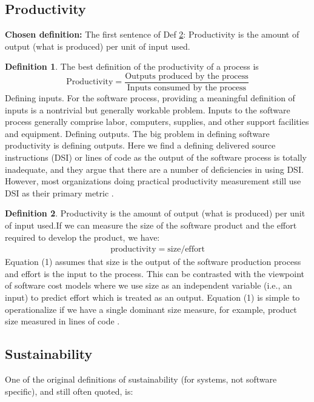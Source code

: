 \documentclass[letterpaper,cleveref]{lipics-v2019}
\theoremstyle{definition}
\newtheorem{defn}{Definition}
\begin{document}
\subsection{Productivity}
\noindent \textbf{Chosen definition:} The first sentence of Def \ref{ProductivitySelected}: Productivity is the amount of output (what is produced) per unit of input used.
\begin{defn}
The best definition of the productivity of a process is
\[\text{Productivity} = \dfrac{\text{Outputs produced by the process}}{\text{Inputs consumed by the process}}\]
Defining inputs. For the software process, providing a meaningful definition of inputs is a nontrivial but generally workable problem. Inputs to the software process generally comprise labor, computers, supplies, and other support facilities and equipment. Defining outputs. The big problem in defining software productivity is defining outputs. Here we find a defining delivered source instructions (DSI) or lines of code as the output of the software process is totally inadequate, and they argue that there are a number of deficiencies in using DSI. However, most organizations doing practical productivity measurement still use DSI as their primary metric \citep{Boehm1987}.
\end{defn}
\begin{defn}
\label{ProductivitySelected}
Productivity is the amount of output (what is produced) per unit of input used.If we can measure the size of the software product and the effort required to develop the product, we have:
\begin{align}
\text{productivity} = \text{size}/\text{effort}
\end{align}
Equation (1) assumes that size is the output of the software production process and effort is the input to the process. This can be contrasted with the viewpoint of software cost models where we use size as an independent variable (i.e., an input) to predict effort which is treated as an output. Equation (1) is simple to operationalize if we have a single dominant size measure, for example, product size measured in lines of code \citep{Kitchenham2004}.
\end{defn}

\subsection{Sustainability}

One of the original definitions of sustainability (for systems, not software
specific), and still often quoted, is:
\end{document}
